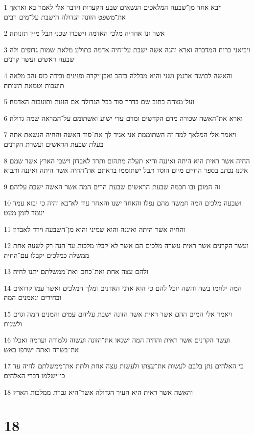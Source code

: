 \par 1 ויבא אחד מן־שבעה המלאכים הנשאים שבע הקערות וידבר אלי לאמר בא ואראך את־משפט הזונה הגדולה הישבת על־מים רבים׃
\par 2 אשר זנו אחריה מלכי האדמה וישכרו שכני תבל מיין תזנותה׃
\par 3 ויביאני ברוח המדברה וארא והנה אשה ישבת על־חיה אדמה כתולע מלאת שמות גדופים ולה שבעה ראשים ועשר קרנים׃
\par 4 והאשה לבושה ארגמן ושני והיא מכללה בזהב ואבן־יקרה ופנינים ובידה כוס זהב מלאה תועבות וטמאת תזנותה׃
\par 5 ועל־מצחה כתוב שם בדרך סוד בבל הגדולה אם הזנות ותועבות האדמה׃
\par 6 וארא את־האשה שכורה מדם הקדשים ומדם עדי ישוע ואשתומם על־המראה שמה גדולה׃
\par 7 ויאמר אלי המלאך למה זה השתוממת אני אגיד לך את־סוד האשה והחיה הנשאת אתה בעלת שבעת הראשים ועשרת הקרנים׃
\par 8 החיה אשר ראית היא היתה ואיננה והיא תעלה מתהום ותרד לאבדון וישבי הארץ אשר שמם איננו נכתב בספר החיים מיום הוסד תבל ישתוממו בראתם את־החיה אשר היתה ואיננה ותבוא׃
\par 9 זה המובן ובו חכמה שבעת הראשים שבעת הרים המה אשר האשה ישבת עליהם׃
\par 10 ושבעה מלכים המה חמשה מהם נפלו והאחד ישנו והאחר עוד לא־בא והיה כי יבוא עמד יעמד לזמן מעט׃
\par 11 והחיה אשר היתה ואיננה והוא שמיני והוא מן־השבעה וירד לאבדון׃
\par 12 ועשר הקרנים אשר ראית עשרה מלכים הם אשר לא־קבלו מלכות עד־הנה רק לשעה אחת ממשלה כמלכים יקבלו עם־החיה׃
\par 13 ולהם עצה אחת ואת־כחם ואת־ממשלתם יתנו לחיה׃
\par 14 המה ילחמו בשה והשה יוכל להם כי הוא אדני האדנים ומלך המלכים ואשר עמו קרואים ובחירים ונאמנים המה׃
\par 15 ויאמר אלי המים ההם אשר ראית אשר הזונה ישבת עליהם עמים והמנים המה וגוים ולשנות׃
\par 16 ועשר הקרנים אשר ראית והחיה המה ישנאו את־הזונה ועשוה גלמודה וערמה ואכלו את־בשרה ואתה ישרפו באש׃
\par 17 כי האלהים נתן בלבם לעשות את־עצתו ולעשות עצה אחת ולתת את־ממשלתם לחיה עד כי־ישלמו דברי האלהים׃
\par 18 והאשה אשר ראית היא העיר הגדולה אשר־היא גברת ממלכות הארץ׃

\chapter{18}

